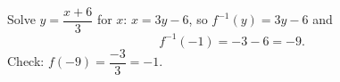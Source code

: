 Solve $y=\dfrac{x+6}{3}$ for $x$: $x=3y-6$, so $f^{-1}(y)=3y-6$ and
\[
f^{-1}(-1)=-3-6=\boxed{-9}.
\]
Check: $f(-9)=\dfrac{-3}{3}=-1$.
